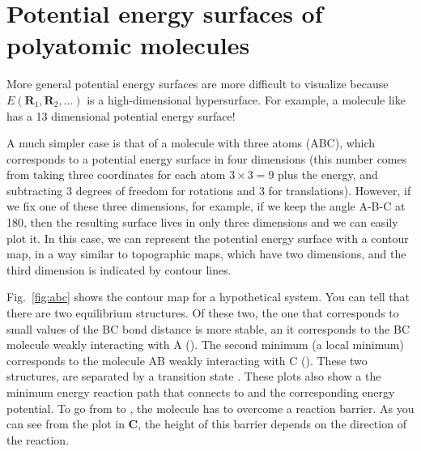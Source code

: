 \documentclass[../Main/chem371-notes.tex]{subfiles}
\begin{document}
\section{Potential energy surfaces of polyatomic molecules}

More general potential energy surfaces are more difficult to visualize because  $E(\mathbf{R}_1,  \mathbf{R}_2,\ldots)$ is a high-dimensional hypersurface.
For example, a molecule like  has a 13 dimensional potential energy surface!

A much simpler case is that of a molecule with three atoms (ABC), which corresponds to a potential energy surface in four dimensions (this number comes from taking three coordinates for each atom $3 \times 3 = 9$ plus the energy, and subtracting 3 degrees of freedom for rotations and 3 for translations).
However, if we fix one of these three dimensions, for example, if we keep the angle A-B-C at 180\textdegree, then the resulting surface lives in only three dimensions and we can easily plot it.
In this case, we can represent the potential energy surface with a contour map, in a way similar to topographic maps, which have two dimensions, and the third dimension is indicated by contour lines.

Fig.~\ref{fig:abc} shows the contour map for a hypothetical  system.
You can tell that there are two equilibrium structures. Of these two, the one that corresponds to small values of the BC bond distance is more stable, an it corresponds to the BC molecule weakly interacting with A ().
The second minimum (a local minimum) corresponds to the molecule AB weakly interacting with C ().
These two structures, are separated by a transition state .
These plots also show a the minimum energy reaction path that connects  to  and the corresponding energy potential.
To go from  to , the molecule has to overcome a reaction barrier.
As you can see from the plot in \textbf{C}, the height of this barrier depends on the direction of the reaction.
\end{document}
